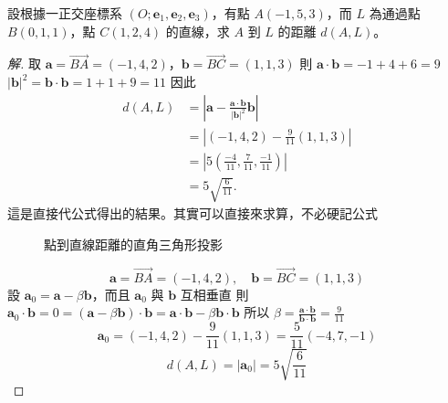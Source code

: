 \begin{example}[例 2]
設根據一正交座標系 $(O; \mathbf{e}_1, \mathbf{e}_2, \mathbf{e}_3)$，有點 $A(-1, 5, 3)$，而 $L$ 為通過點 $B(0, 1, 1)$，點 $C(1, 2, 4)$ 的直線，求 $A$ 到 $L$ 的距離 $d(A, L)$。
\end{example}
\begin{proof}[解]
取 $\mathbf{a} = \vec{BA} = (-1, 4, 2)$，$\mathbf{b} = \vec{BC} = (1, 1, 3)$
則 $\mathbf{a} \cdot \mathbf{b} = -1 + 4 + 6 = 9$
$|\mathbf{b}|^2 = \mathbf{b} \cdot \mathbf{b} = 1 + 1 + 9 = 11$
因此
\begin{align*}
d(A, L) &= \left| \mathbf{a} - \frac{\mathbf{a} \cdot \mathbf{b}}{|\mathbf{b}|^2} \mathbf{b} \right| \\
&= \left| (-1, 4, 2) - \frac{9}{11}(1, 1, 3) \right| \\
&= \left| 5\left( \frac{-4}{11}, \frac{7}{11}, \frac{-1}{11} \right) \right| \\
&= 5 \sqrt{\frac{6}{11}}.
\end{align*}
這是直接代公式得出的結果。其實可以直接來求算，不必硬記公式

\begin{figure}[H]
\centering
{}
\caption{點到直線距離的直角三角形投影}
\label{fig:5-8}
\end{figure}

\[ \mathbf{a} = \vec{BA} = (-1, 4, 2),\quad \mathbf{b} = \vec{BC} = (1, 1, 3) \]
設 $\mathbf{a}_0 = \mathbf{a} - \beta \mathbf{b}$，而且 $\mathbf{a}_0$ 與 $\mathbf{b}$ 互相垂直
則 $\mathbf{a}_0 \cdot \mathbf{b} = 0 = (\mathbf{a} - \beta \mathbf{b}) \cdot \mathbf{b} = \mathbf{a} \cdot \mathbf{b} - \beta \mathbf{b} \cdot \mathbf{b}$
所以 $\beta = \frac{\mathbf{a} \cdot \mathbf{b}}{\mathbf{b} \cdot \mathbf{b}} = \frac{9}{11}$
\[ \mathbf{a}_0 = (-1, 4, 2) - \frac{9}{11}(1, 1, 3) = \frac{5}{11}(-4, 7, -1) \]
\[ d(A, L) = |\mathbf{a}_0| = 5 \sqrt{\frac{6}{11}} \]
\end{proof}

